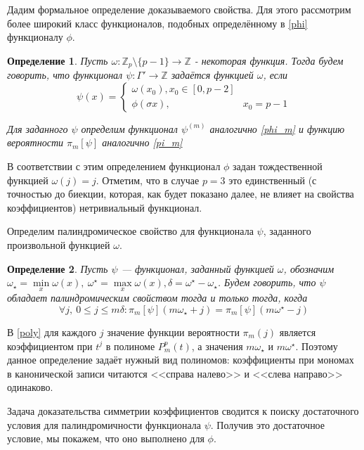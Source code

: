 \documentclass[14pt, a4paper, russian]{report}
\newtheorem{definition}{\indent Определение}
\begin{document}
Дадим формальное определение доказываемого свойства. Для этого рассмотрим более широкий класс функционалов, подобных определённому в \cref{phi} функционалу $\phi$.
\begin{definition} \label{psi}
Пусть $\omega: \mathbb{Z}_p \setminus \{p-1\} \to \mathbb{Z}$ - некоторая функция. Тогда будем говорить, что функционал $\psi: \Gamma' \to \mathbb{Z}$ задаётся функцией $\omega$, если
$$
    \psi(x) = \begin{cases}
                    \omega(x_0),x_0 \in \left[0,  p - 2\right] \\
                    \phi(\sigma x), & x_0 = p - 1
                \end{cases}
$$

Для заданного $\psi$ определим функционал $\psi^{(m)}$ аналогично \cref{phi_m} и функцию вероятности $\pi_m[\psi]$ аналогично \cref{pi_m}
\end{definition}

В соответствии с этим определением функционал $\phi$ задан тождественной функцией $\omega(j)=j$. Отметим, что в случае $p=3$ это единственный (с точностью до биекции, которая, как будет показано далее, не влияет на свойства коэффициентов) нетривиальный функционал. 

Определим палиндромическое свойство для функционала $\psi$, заданного произвольной функцией $\omega$.

\begin{definition}\label{palindromic}
Пусть $\psi$ --- функционал, заданный функцией $\omega$, обозначим $\omega_\star = \min\limits_x \omega(x),\ \omega^\star = \max\limits_x \omega(x), \delta=\omega^\star - \omega_\star$. Будем говорить, что  $\psi$  \emph{обладает палиндромическим свойством} тогда и только тогда, когда
$$
\forall j,\ 0 \le j \le m\delta:   \pi_m[\psi](m\omega_\star + j)=\pi_m[\psi](m\omega^\star-j)
$$
\end{definition}

В \cref{poly} для каждого $j$ значение функции вероятности $\pi_m(j)$ является коэффициентом при $t^j$ в полиноме $P_m^p(t)$, а значения $m\omega_\star$ и $m\omega^\star$. Поэтому данное определение задаёт нужный вид полиномов: коэффициенты при мономах в канонической записи читаются <<справа налево>> и <<слева направо>> одинаково.

Задача доказательства симметрии коэффициентов сводится к поиску достаточного условия для палиндромичности функционала $\psi$. Получив это достаточное условие, мы покажем, что оно выполнено для $\phi$.
\end{document}

